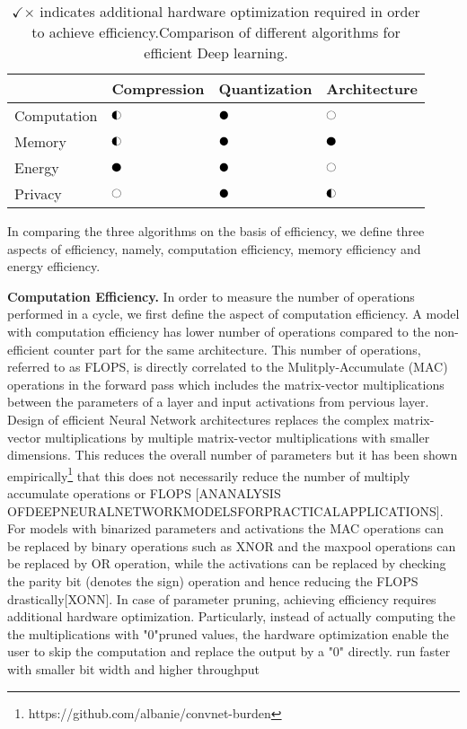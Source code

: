 \begin{table}[!htb]
\begin{center}
\renewcommand\arraystretch{1.5}
\fontsize{6.7pt}{6.7pt}\selectfont
\begin{tabular}{|l|l|l|l|}
\hline
 & Compression & Quantization & Architecture  \\
\hline
Computation & $\smark$  & $\cmark$   & $\xmark$ \\
\hline
Memory &  $\smark$ & $\cmark$   & $\cmark$ \\
\hline
Energy &  $\cmark$   & $\cmark$   & $\xmark$ \\
\hline
Privacy &  $\xmark$   & $\cmark$   & $\smark$ \\
\hline
\end{tabular}
\end{center}
\caption{$\checkmark$$\times$ indicates additional hardware optimization required in order to achieve efficiency.Comparison of different algorithms for efficient Deep learning.}
\label{tbl:comparison}
\end{table}


In comparing the three algorithms on the basis of efficiency, we define three aspects of efficiency, namely, computation efficiency, memory efficiency and energy efficiency.

\noindent\textbf{Computation Efficiency.} In order to measure the number of operations performed in a cycle, we first define the aspect of computation efficiency.
A model with computation efficiency has lower number of operations compared to the non-efficient counter part for the same architecture.
This number of operations, referred to as FLOPS, is directly correlated to the Mulitply-Accumulate (MAC) operations in the forward pass which includes the matrix-vector multiplications between the parameters of a layer and input activations from pervious layer.
Design of efficient Neural Network architectures replaces the complex matrix-vector multiplications by multiple matrix-vector multiplications with smaller dimensions.
This reduces the overall number of parameters but it has been shown empirically\footnote{https://github.com/albanie/convnet-burden} that this does not necessarily reduce the number of multiply accumulate operations or FLOPS [ANANALYSIS  OFDEEPNEURALNETWORKMODELSFORPRACTICALAPPLICATIONS].
For models with binarized parameters and activations the MAC operations can be replaced by binary operations such as XNOR and the maxpool operations can be replaced by OR operation, while the activations can be replaced by checking the parity bit (denotes the sign) operation and hence reducing the FLOPS drastically[XONN].
In case of parameter pruning, achieving efficiency requires additional hardware optimization. Particularly, instead of actually computing the the multiplications with "0"pruned values, the hardware optimization enable the user to skip the computation and replace the output by a "0" directly.
run faster with smaller bit width and higher throughput

